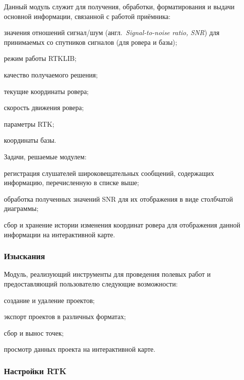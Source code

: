 Данный модуль служит для получения, обработки, форматирования и выдачи основной информации, связанной с работой приёмника:
\begin{dashitemize}
  \item значения отношений сигнал/шум (англ.~\emph{Signal-to-noise ratio, SNR}) для принимаемых со спутников сигналов (для ровера и базы);
  \item режим работы RTKLIB;
  \item качество получаемого решения;
  \item текущие координаты ровера;
  \item скорость движения ровера;
  \item параметры RTK;
  \item координаты базы.
\end{dashitemize}

Задачи, решаемые модулем:
\begin{dashitemize}
  \item регистрация слушателей широковещательных сообщений, содержащих информацию, перечисленную в списке выше;
  \item обработка полученных значений SNR для их отображения в виде столбчатой диаграммы;
  \item сбор и хранение истории изменения координат ровера для отображения данной информации на интерактивной карте.
\end{dashitemize}

\subsubsection{Изыскания}

Модуль, реализующий инструменты для проведения полевых работ и предоставляющий пользователю следующие возможности:
\begin{dashitemize}
  \item создание и удаление проектов;
  \item экспорт проектов в различных форматах;
  \item сбор и вынос точек;
  \item просмотр данных проекта на интерактивной карте.
\end{dashitemize}

\subsubsection{Настройки RTK}


